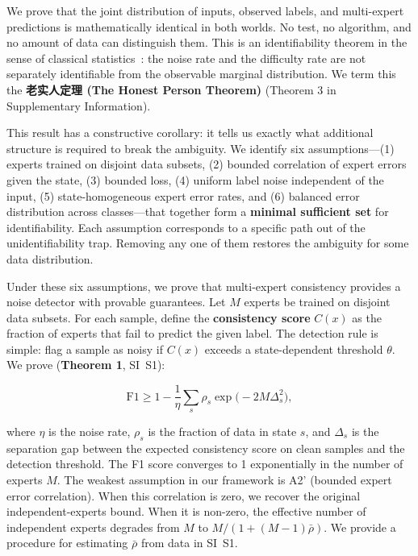 \documentclass[12pt,a4paper]{article}
\begin{document}
We prove that the joint distribution of inputs, observed labels, and multi-expert predictions is mathematically identical in both worlds. No test, no algorithm, and no amount of data can distinguish them. This is an identifiability theorem in the sense of classical statistics~\cite{casella2002}: the noise rate and the difficulty rate are not separately identifiable from the observable marginal distribution. We term this the \textbf{老实人定理 (The Honest Person Theorem)} (Theorem 3 in Supplementary Information).

This result has a constructive corollary: it tells us exactly what additional structure is required to break the ambiguity. We identify six assumptions---(1) experts trained on disjoint data subsets, (2) bounded correlation of expert errors given the state, (3) bounded loss, (4) uniform label noise independent of the input, (5) state-homogeneous expert error rates, and (6) balanced error distribution across classes---that together form a \textbf{minimal sufficient set} for identifiability. Each assumption corresponds to a specific path out of the unidentifiability trap. Removing any one of them restores the ambiguity for some data distribution.

Under these six assumptions, we prove that multi-expert consistency provides a noise detector with provable guarantees. Let $M$ experts be trained on disjoint data subsets. For each sample, define the \textbf{consistency score} $C(x)$ as the fraction of experts that fail to predict the given label. The detection rule is simple: flag a sample as noisy if $C(x)$ exceeds a state-dependent threshold $\theta$. We prove (\textbf{Theorem 1}, SI~S1):

\begin{equation}
\mathrm{F1} \geq 1 - \frac{1}{\eta}\sum_{s} \rho_s \exp\bigl(-2M\Delta_s^2\bigr),
\end{equation}

where $\eta$ is the noise rate, $\rho_s$ is the fraction of data in state $s$, and $\Delta_s$ is the separation gap between the expected consistency score on clean samples and the detection threshold. The F1 score converges to 1 exponentially in the number of experts $M$. The weakest assumption in our framework is A2' (bounded expert error correlation). When this correlation is zero, we recover the original independent-experts bound. When it is non-zero, the effective number of independent experts degrades from $M$ to $M/(1+(M-1)\bar{\rho})$. We provide a procedure for estimating $\bar{\rho}$ from data in SI~S1.
\end{document}
